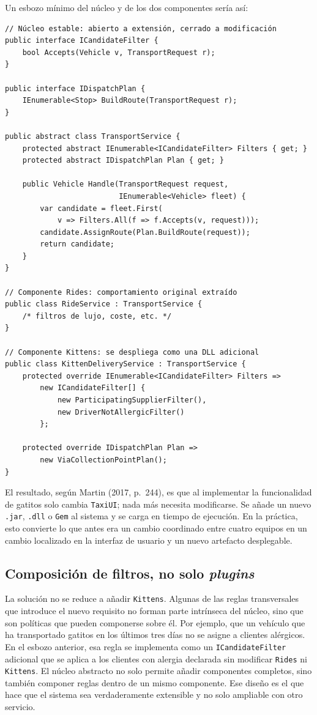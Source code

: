 \documentclass[12pt,a4paper]{article}
\begin{document}
Un esbozo mínimo del núcleo y de los dos componentes sería así:

\begin{lstlisting}
// Núcleo estable: abierto a extensión, cerrado a modificación
public interface ICandidateFilter {
    bool Accepts(Vehicle v, TransportRequest r);
}

public interface IDispatchPlan {
    IEnumerable<Stop> BuildRoute(TransportRequest r);
}

public abstract class TransportService {
    protected abstract IEnumerable<ICandidateFilter> Filters { get; }
    protected abstract IDispatchPlan Plan { get; }

    public Vehicle Handle(TransportRequest request,
                          IEnumerable<Vehicle> fleet) {
        var candidate = fleet.First(
            v => Filters.All(f => f.Accepts(v, request)));
        candidate.AssignRoute(Plan.BuildRoute(request));
        return candidate;
    }
}

// Componente Rides: comportamiento original extraído
public class RideService : TransportService {
    /* filtros de lujo, coste, etc. */
}

// Componente Kittens: se despliega como una DLL adicional
public class KittenDeliveryService : TransportService {
    protected override IEnumerable<ICandidateFilter> Filters =>
        new ICandidateFilter[] {
            new ParticipatingSupplierFilter(),
            new DriverNotAllergicFilter()
        };

    protected override IDispatchPlan Plan =>
        new ViaCollectionPointPlan();
}
\end{lstlisting}

El resultado, según Martin (2017, p.~244), es que al implementar la funcionalidad de gatitos solo cambia \texttt{TaxiUI}; nada más necesita modificarse. Se añade un nuevo \texttt{.jar}, \texttt{.dll} o \texttt{Gem} al sistema y se carga en tiempo de ejecución. En la práctica, esto convierte lo que antes era un cambio coordinado entre cuatro equipos en un cambio localizado en la interfaz de usuario y un nuevo artefacto desplegable.

\subsection{Composición de filtros, no solo \emph{plugins}}

La solución no se reduce a añadir \texttt{Kittens}. Algunas de las reglas transversales que introduce el nuevo requisito no forman parte intrínseca del núcleo, sino que son políticas que pueden componerse sobre él. Por ejemplo, que un vehículo que ha transportado gatitos en los últimos tres días no se asigne a clientes alérgicos. En el esbozo anterior, esa regla se implementa como un \texttt{ICandidateFilter} adicional que se aplica a los clientes con alergia declarada sin modificar \texttt{Rides} ni \texttt{Kittens}. El núcleo abstracto no solo permite añadir componentes completos, sino también componer reglas dentro de un mismo componente. Ese diseño es el que hace que el sistema sea verdaderamente extensible y no solo ampliable con otro servicio.
\end{document}
